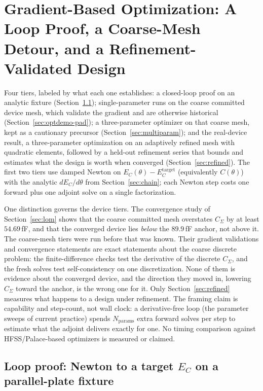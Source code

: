 \documentclass{anvil-paper}
\begin{document}
\section{Gradient-Based Optimization: A Loop Proof, a Coarse-Mesh
Detour, and a Refinement-Validated Design}
\label{sec:optdemo}

Four tiers, labeled by what each one establishes: a closed-loop proof
on an analytic fixture (Section~\ref{sec:optdemo-plate});
single-parameter runs on the coarse committed device mesh, which
validate the gradient and are otherwise historical
(Section~\ref{sec:optdemo-pad}); a three-parameter optimizer on that
coarse mesh, kept as a cautionary precursor
(Section~\ref{sec:multiparam}); and the real-device result, a
three-parameter optimization on an adaptively refined mesh with
quadratic elements, followed by a held-out refinement series that
bounds and estimates what the design is worth when converged
(Section~\ref{sec:refined}). The first two tiers use damped Newton on
$E_C(\theta) - E_C^{\mathrm{target}}$ (equivalently
$C(\theta)$) with the analytic $dE_C/d\theta$ from
Section~\ref{sec:chain}; each Newton step costs one forward plus one
adjoint solve on a single factorization.

One distinction governs the device tiers. The convergence study of
Section~\ref{sec:lom} shows that the coarse committed mesh overstates
$C_\Sigma$ by at least $54.69$\,fF, and that the converged device lies
\emph{below} the $89.9$\,fF anchor, not above it. The coarse-mesh tiers
were run before that was known. Their gradient validations and
convergence statements are exact statements about the coarse discrete
problem: the finite-difference checks test the derivative of the
discrete $C_\Sigma$, and the fresh solves test self-consistency on one
discretization. None of them is evidence about the converged device,
and the direction they moved in, lowering $C_\Sigma$ toward the anchor,
is the wrong one for it. Only Section~\ref{sec:refined} measures what
happens to a design under refinement. The framing claim is
capability and step-count, not wall clock: a derivative-free loop
(the parameter sweeps of current practice) spends $N_{\mathrm{params}}$
extra forward solves per step to estimate what the adjoint delivers
exactly for one. No timing comparison against HFSS/Palace-based
optimizers is measured or claimed.

\subsection{Loop proof: Newton to a target \texorpdfstring{$E_C$}{E\_C} on a parallel-plate
fixture}
\label{sec:optdemo-plate}
\end{document}
